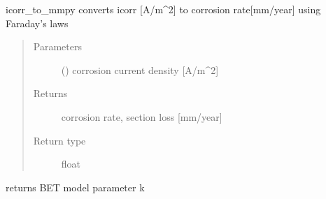 \documentclass[letterpaper,10pt,english]{sphinxmanual}
\begin{document}
\begin{fulllineitems}
\label{\detokenize{corrosion:corrosion.icorr_to_mmpy}}
\sphinxAtStartPar
icorr\_to\_mmpy converts icorr {[}A/m\textasciicircum{}2{]} to corrosion rate{[}mm/year{]} using Faraday’s laws
\begin{quote}\begin{description}
\item[{Parameters}] \leavevmode
\sphinxAtStartPar
{} () \textendash{} corrosion current density {[}A/m\textasciicircum{}2{]}

\item[{Returns}] \leavevmode
\sphinxAtStartPar
corrosion rate, section loss {[}mm/year{]}

\item[{Return type}] \leavevmode
\sphinxAtStartPar
float

\end{description}\end{quote}

\end{fulllineitems}


\begin{fulllineitems}
\label{\detokenize{corrosion:corrosion.k_f}}
\sphinxAtStartPar
returns BET model parameter k

\end{fulllineitems}

\end{document}
